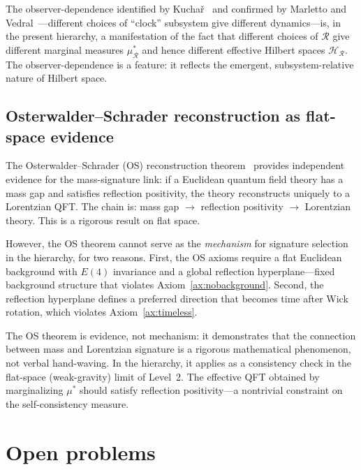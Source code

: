 \documentclass[12pt,a4paper]{article}
\theoremstyle{definition}
\theoremstyle{remark}
\begin{document}
The observer-dependence identified by Kucha\v{r}~\cite{kuchar} and
confirmed by Marletto and Vedral~\cite{marletto_vedral}---different
choices of ``clock'' subsystem give different dynamics---is, in the
present hierarchy, a manifestation of the fact that different choices
of $\mathcal{R}$ give different marginal measures $\mu^*_\mathcal{R}$
and hence different effective Hilbert spaces
$\mathcal{H}_\mathcal{R}$. The observer-dependence is a feature:
it reflects the emergent, subsystem-relative nature of Hilbert space.

\subsection{Osterwalder--Schrader reconstruction as flat-space evidence}

The Osterwalder--Schrader (OS) reconstruction
theorem~\cite{osterwalder_schrader} provides independent evidence for the
mass-signature link: if a Euclidean quantum field theory has a mass gap
and satisfies reflection positivity, the theory reconstructs uniquely to
a Lorentzian QFT. The chain is: mass gap $\to$ reflection positivity
$\to$ Lorentzian theory. This is a rigorous result on flat space.

However, the OS theorem cannot serve as the \emph{mechanism} for
signature selection in the hierarchy, for two reasons. First, the OS
axioms require a flat Euclidean background with $E(4)$ invariance and a
global reflection hyperplane---fixed background structure that violates
Axiom~\ref{ax:nobackground}. Second, the reflection hyperplane defines a
preferred direction that becomes time after Wick rotation, which violates
Axiom~\ref{ax:timeless}.

The OS theorem is evidence, not mechanism: it demonstrates that the
connection between mass and Lorentzian signature is a rigorous
mathematical phenomenon, not verbal hand-waving. In the hierarchy, it
applies as a consistency check in the flat-space (weak-gravity) limit
of Level~2. The effective QFT obtained by marginalizing $\mu^*$ should
satisfy reflection positivity---a nontrivial constraint on the
self-consistency measure.

\section{Open problems}
\label{sec:open}
\end{document}
